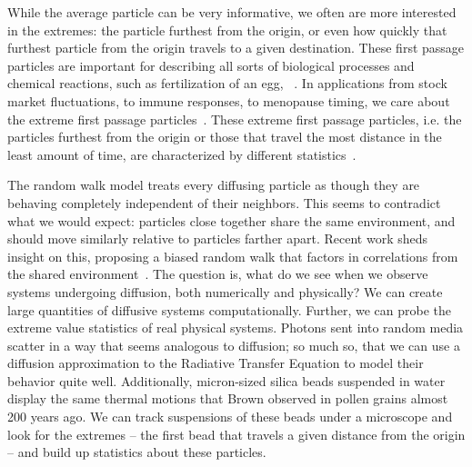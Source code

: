 While the average particle can be very informative, we often are more interested in the extremes: the particle furthest from the origin, or even how quickly that furthest particle from the origin travels to a given destination. These first passage particles are important for describing all sorts of biological processes and chemical reactions, such as fertilization of an egg, ~\cite{redner_guide_2001,polizzi_mean_2016}. In applications from stock market fluctuations, to immune responses, to menopause timing, we care about the extreme first passage particles~\cite{barney_first-passage-time_2017,zsurkis_first_2024,schuss_redundancy_2019,lawley_slowest_2023}. These extreme first passage particles, i.e. the particles furthest from the origin or those that travel the most distance in the least amount of time, are characterized by different statistics~\cite{lawley_distribution_2020,lawley_probabilistic_2020,lawley_universal_2020}. 

The random walk model treats every diffusing particle as though they are behaving completely independent of their neighbors. This seems to contradict what we would expect: particles close together share the same environment, and should move similarly relative to particles farther apart. Recent work sheds insight on this, proposing a biased random walk that factors in correlations from the shared environment~\cite{barraquand_random-walk_2017,barraquand_moderate_2020}. The question is, what do we see when we observe systems undergoing diffusion, both numerically and physically? We can create large quantities of diffusive systems computationally. Further, we can probe the extreme value statistics of real physical systems. Photons sent into random media scatter in a way that seems analogous to diffusion; so much so, that we can use a diffusion approximation to the Radiative Transfer Equation to model their behavior quite well. Additionally, micron-sized silica beads suspended in water display the same thermal motions that Brown observed in pollen grains almost 200 years ago. We can track suspensions of these beads under a microscope and look for the extremes -- the first bead that travels a given distance from the origin -- and build up statistics about these particles.

